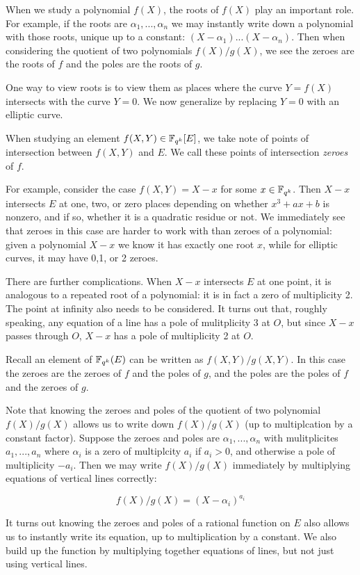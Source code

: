 When we study a polynomial $f(X)$, the roots of $f(X)$ play an important
role. For example, if the roots are $\alpha_1,...,\alpha_n$ we may
instantly write down a polynomial with those roots, unique up to a constant:
$(X-\alpha_1)...(X-\alpha_n)$. Then when considering the quotient of
two polynomials $f(X)/g(X)$, we see the zeroes are the roots of $f$ and
the poles are the roots of $g$.

One way to view roots is to view them as places where the curve $Y = f(X)$
intersects with the curve $Y = 0$. We now generalize by replacing $Y=0$
with an elliptic curve.

When studying an element $f(X,Y) \in \mathbb{F}_{q^k}[E]$, we take note of points of
intersection between $f(X,Y)$ and $E$.
We call these points of intersection \emph{zeroes} of $f$.

For example, consider the case $f(X,Y) = X-x$ for some $x\in\mathbb{F}_{q^k}$.
Then $X-x$ intersects $E$ at one, two, or zero places depending
on whether $x^3 + a x + b$ is nonzero, and if so, whether it is a quadratic
residue or not.
We immediately see that zeroes in this case are harder to work with than
zeroes of a polynomial: given a polynomial $X - x$ we know it has
exactly one root $x$, while for elliptic curves, it may have 0,1, or 2
zeroes.

There are further complications. When $X - x$ intersects $E$ at one point,
it is analogous to a repeated root of a polynomial: it is in
fact a zero of multiplicity 2. The point at infinity also needs to be
considered. It turns out that, roughly speaking, any equation of a line
has a pole of mulitplicity 3 at $O$, but since $X - x$ passes through $O$,
$X-x$ has a pole of multiplicity 2 at $O$.

Recall an element of $\mathbb{F}_{q^k}(E)$ can be written as $f(X,Y)/g(X,Y)$.
In this case the zeroes are the zeroes of $f$ and the poles of $g$,
and the poles are the poles of $f$ and the zeroes of $g$.

Note that knowing the zeroes and poles of the quotient of two
polynomial $f(X)/g(X)$ allows us to write down $f(X)/g(X)$ (up to multiplcation
by a constant factor). Suppose the zeroes and poles are $\alpha_1,...,\alpha_n$
with mulitplicites $a_1,...,a_n$ where $\alpha_i$ is a zero of multiplcity
$a_i$ if $a_i > 0$, and otherwise a pole of multiplicity $-a_i$. Then
we may write $f(X)/g(X)$ immediately by multiplying equations of
vertical lines correctly:

\[ f(X)/g(X) = (X-\alpha_i)^{a_i} \]

It turns out knowing the zeroes and poles of
a rational function on $E$ also allows us to instantly write its equation,
up to multiplication by a constant. We also build up the function by
multiplying together equations of lines, but not just using
vertical lines.

